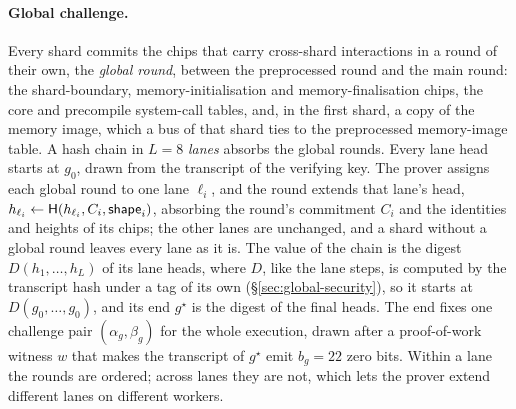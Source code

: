 \paragraph{Global challenge.} Every shard commits the chips that carry cross-shard interactions in a round of their own, the \emph{global round}, between the preprocessed round and the main round: the shard-boundary, memory-initialisation and memory-finalisation chips, the core and precompile system-call tables, and, in the first shard, a copy of the memory image, which a bus of that shard ties to the preprocessed memory-image table. A hash chain in $L = 8$ \emph{lanes} absorbs the global rounds. Every lane head starts at $g_0$, drawn from the transcript of the verifying key. The prover assigns each global round to one lane $\ell_i$, and the round extends that lane's head, $h_{\ell_i} \gets \mathsf{H}(h_{\ell_i}, C_i, \mathsf{shape}_i)$, absorbing the round's commitment $C_i$ and the identities and heights of its chips; the other lanes are unchanged, and a shard without a global round leaves every lane as it is. The value of the chain is the digest $D(h_1, \ldots, h_L)$ of its lane heads, where $D$, like the lane steps, is computed by the transcript hash under a tag of its own (\S\ref{sec:global-security}), so it starts at $D(g_0, \ldots, g_0)$, and its end $g^\star$ is the digest of the final heads. The end fixes one challenge pair $(\alpha_g, \beta_g)$ for the whole execution, drawn after a proof-of-work witness $w$ that makes the transcript of $g^\star$ emit $b_g = 22$ zero bits. Within a lane the rounds are ordered; across lanes they are not, which lets the prover extend different lanes on different workers.


